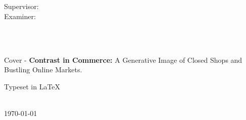\newpage
\thispagestyle{plain}
\vspace*{3.5cm}
\maintitle \\
\\[0.1cm]
\authorm \\
\authorp \\
\authort
\setlength{\parskip}{1cm}


Supervisor: \supervisor \\
Examiner: \examiner \setlength{\parskip}{1cm}

\subject \\	
\dept \\
\university \\
\address \\
\setlength{\parskip}{0.5cm}


\vspace*{5.5cm}
Cover - \textbf{Contrast in Commerce:} A Generative Image of Closed Shops and Bustling Online Markets. \setlength{\parskip}{0.5cm}

Typeset in \LaTeX \tagtemp\\
\address \ \the\year \\
\today

\newpage